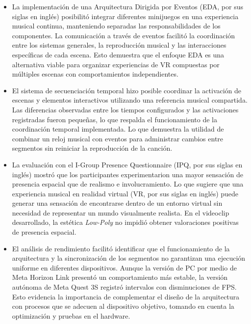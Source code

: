\begin{itemize}
    \item La implementación de una Arquitectura Dirigida por Eventos (EDA, por sus siglas en inglés)
    posibilitó integrar diferentes minijuegos en una experiencia musical continua, manteniendo separadas las responsabilidades
    de los componentes. La comunicación a través de eventos facilitó la coordinación entre los sistemas generales, 
    la reproducción musical y las interacciones específicas de cada escena. Esto demuestra que el enfoque EDA es una alternativa viable para organizar
    experiencias de VR compuestas por múltiples escenas con comportamientos independientes.
    
    \item El sistema de secuenciación temporal hizo posible coordinar la activación de escenas y elementos interactivos utilizando una referencia musical compartida. 
    Las diferencias observadas entre los tiempos configurados y las activaciones registradas
    fueron pequeñas, lo que respalda el funcionamiento de la coordinación temporal implementada.
    Lo que demuestra la utilidad de combinar un reloj musical con eventos para administrar cambios entre segmentos sin reiniciar la reproducción de la canción.
    
    \item La evaluación con el I-Group Presence Questionnaire (IPQ, por sus siglas en inglés) mostró que los participantes experimentarion una mayor sensación de presencia espacial que de realismo e involucramiento.
    Lo que sugiere que una experiencia musical en realidad virtual (VR, por sus siglas en inglés) puede generar una sensación de encontrarse dentro de un entorno virtual
    sin necesidad de representar un mundo visualmente realista. En el videoclip desarrollado, la estética \emph{Low-Poly} no impidió obtener valoraciones positivas 
    de presencia espacial.

    \item El análisis de rendimiento facilitó identificar que el funcionamiento de la arquitectura y la sincronización de los segmentos no garantizan una ejecución uniforme en diferentes dispositivos.
    Aunque la versión de PC por medio de Meta Horizon Link presentó un comportamiento más estable, la versión autónoma de Meta Quest 3S registró intervalos con disminuciones de FPS. 
    Esto evidencia la importancia de complementar el diseño de la arquitectura con procesos que se adecuen al dispositivo objetivo, tomando en cuenta la optimización y pruebas en el hardware. 
    

\end{itemize}
